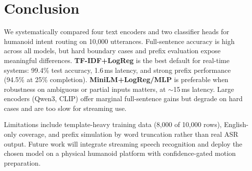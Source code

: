 \documentclass{article}
\begin{document}
\section{Conclusion}

We systematically compared four text encoders and two classifier heads for
humanoid intent routing on 10{,}000 utterances.
Full-sentence accuracy is high across all models, but hard boundary cases and
prefix evaluation expose meaningful differences.
\textbf{TF-IDF+LogReg} is the best default for real-time systems: 99.4\% test
accuracy, 1.6\,ms latency, and strong prefix performance (94.5\% at 25\%
completion).
\textbf{MiniLM+LogReg/MLP} is preferable when robustness on ambiguous or
partial inputs matters, at $\sim$15\,ms latency.
Large encoders (Qwen3, CLIP) offer marginal full-sentence gains but degrade on
hard cases and are too slow for streaming use.

Limitations include template-heavy training data (8{,}000 of 10{,}000 rows),
English-only coverage, and prefix simulation by word truncation rather than
real ASR output.
Future work will integrate streaming speech recognition and deploy the chosen
model on a physical humanoid platform with confidence-gated motion preparation.
\end{document}
